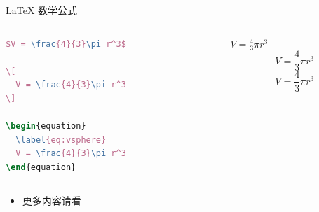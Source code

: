 \documentclass{beamer} %
\begin{document}
\begin{frame}[fragile]{\LaTeX{} 数学公式}
    \begin{columns}
        \begin{column}{.55\textwidth}
\begin{lstlisting}[language=TeX]
$V = \frac{4}{3}\pi r^3$

\[
  V = \frac{4}{3}\pi r^3
\]

\begin{equation}
  \label{eq:vsphere}
  V = \frac{4}{3}\pi r^3
\end{equation}
\end{lstlisting}
        \end{column}
        \begin{column}{.4\textwidth}
            $V = \frac{4}{3}\pi r^3$
            \[
                V = \frac{4}{3}\pi r^3
            \]
            \begin{equation}
                \label{eq:vsphere}
                V = \frac{4}{3}\pi r^3
            \end{equation}
        \end{column}
    \end{columns}
    \begin{itemize}
        \item 更多内容请看 \href{https://zh.wikipedia.org/wiki/Help:数学公式}{\color{purple}{这里}}
    \end{itemize}
\end{frame}
\end{document}
